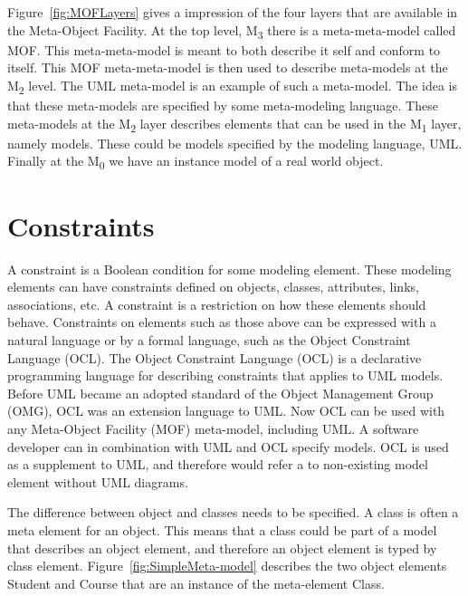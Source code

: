 Figure~\ref{fig:MOFLayers} gives a impression of the four layers that are
available in the Meta-Object Facility. At the top level, M\textsubscript{3}
there is a meta-meta-model called MOF. This meta-meta-model is meant to both
describe it self and conform to itself. This MOF meta-meta-model is then used to
describe meta-models at the M\textsubscript{2} level. The UML meta-model is an
example of such a meta-model. The idea is that these meta-models are specified by
some meta-modeling language. These meta-models at the M\textsubscript{2} layer
describes elements that can be used in the M\textsubscript{1} layer, namely
models. These could be models specified by the modeling language, UML. Finally
at the M\textsubscript{0} we have an instance model of a real world object. 




 
\section{Constraints}

A constraint is a Boolean condition for some modeling element. These modeling
elements can have constraints defined on objects, classes, attributes,
links, associations, etc. A constraint is a restriction on how these
elements should behave. Constraints on elements such as those above can be
expressed with a natural language or by a formal language, such as the
Object Constraint Language\cite{OCL} (OCL). The Object Constraint Language (OCL)
is a declarative programming language for describing constraints that applies to
UML models. Before UML became an adopted standard of the Object Management Group
(OMG), OCL was an extension language to UML. Now OCL can be used with any
Meta-Object Facility (MOF) meta-model, including UML. A software developer
can in combination with UML and OCL specify models. OCL is used as a supplement
to UML, and therefore would refer a to non-existing model element without UML
diagrams\cite{Warmer:2003:OCL:861416}.

The difference between object and classes needs to be specified. A class
is often a meta element for an object. This means that a class could be part of
a model that describes an object element, and therefore an object element is
typed by class element\cite{OO_UML}. Figure~\ref{fig:SimpleMeta-model} describes
the two object elements Student and Course that are an instance of the
meta-element Class.

